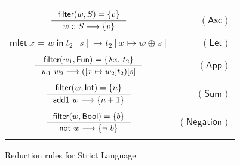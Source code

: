 \documentclass[preprint,authoryear,sort&compress,9pt,nocopyrightspace]{article}
\newcommand\rulename[1]{\mathsf{(#1)}}
\newcommand{\tto}{\longrightarrow}
\newcommand{\conf}[2][s]{(#2)[#1]}
\newcommand{\confextW}[1]{#1 [x \mapsto w \oplus s]}
\newcommand{\ascripS}[1]{#1::S}
\newcommand{\oletP}[3]{\mathsf{mlet} \ x = #2 \ \mathsf{in}  \ #3}
\newcommand{\absST}[2]{\lambda #1. \ #2}
\newcommand{\negacion}[1]{\mathsf{not} \ #1}
\newcommand{\suma}[1]{\mathsf{add1} \ #1}
\newcommand{\boolt}{\mathsf{Bool}}
\newcommand{\intt}{\mathsf{Int}}
\newcommand{\funt}{\mathsf{Fun}}
\newcommand{\filtrar}{\mathsf{filter}}
\newcommand{\buscar}{\mathsf{lookup}}
\newcommand{\semanticC}{Strict Language}
\begin{document}
\begin{figure}[]
\begin{small}
\begin{center}
\begin{tabular}{|c r|}
\hline
&\\
$ \inference {\filtrar(w, S) = \{v\}} {\ascripS{w} \tto \{v\} } $&$\rulename{Asc} $\\
&\\
${\oletP{T_1}{w}{t_2[s]} \tto \confextW{t_2}}$&$\rulename{Let} $\\
&\\

$\inference{\filtrar(w_1, \funt) = \{\absST{x}{t_2} \}}{w_1 \ w_2 \tto \conf{[x \mapsto w_2]{t_2}}}$&$\rulename{App}$\\
&\\
$\inference {\filtrar(w, \intt)  = \{n\} }{\suma{w} \tto \{n + 1\}}$&$\rulename{Sum}$\\
&\\
$\inference {\filtrar(w, \boolt)  = \{b\} }{\negacion{w}\tto {\{\neg \ b\}}}$&$\rulename{Negation}$\\

&\\
\hline
\end{tabular}
\caption{Reduction rules for \semanticC.}
\label{tabla:reductionRulesStrictMore}
\end{center}
\end{small}
\end{figure}
\end{document}
